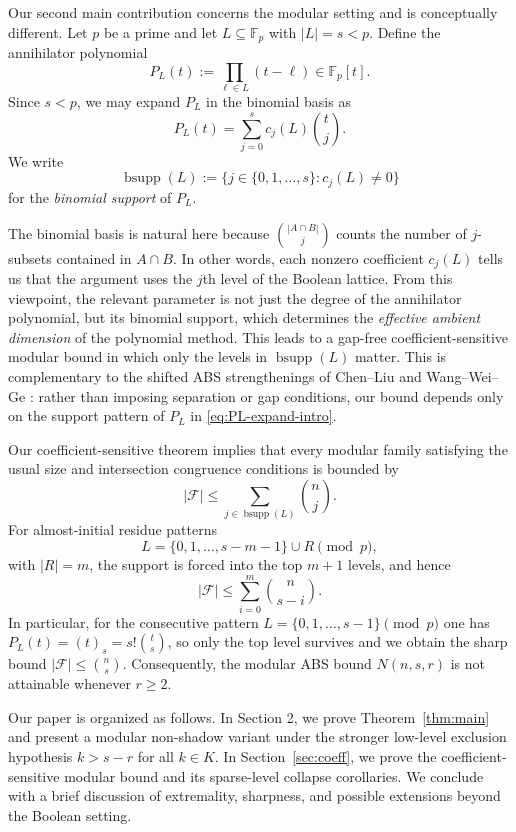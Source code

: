 \documentclass[11pt]{article}
\theoremstyle{plain}
\theoremstyle{remark}
\newcommand{\F}{\mathcal{F}}
\newcommand{\abs}[1]{\left|#1\right|}
\newcommand{\bsupp}{\operatorname{bsupp}}
\begin{document}
Our second main contribution concerns the modular setting and is conceptually different.
Let $p$ be a prime and let $L\subseteq\mathbb{F}_p$ with $\abs{L}=s<p$.
Define the annihilator polynomial
$$
  P_L(t):=\prod_{\ell\in L}(t-\ell)\in\mathbb{F}_p[t].
$$
Since $s<p$, we may expand $P_L$ in the binomial basis as
\begin{equation}\label{eq:PL-expand-intro}
  P_L(t)=\sum_{j=0}^{s} c_j(L)\binom{t}{j}.
\end{equation}
We write
$$
  \bsupp(L):=\{j\in\{0,1,\dots,s\}: c_j(L)\neq 0\}
$$
for the \emph{binomial support} of $P_L$.

The binomial basis is natural here because $\binom{|A\cap B|}{j}$ counts the number of $j$-subsets contained in $A\cap B$.
In other words, each nonzero coefficient $c_j(L)$ tells us that the argument uses the $j$th level of the
Boolean lattice.
From this viewpoint, the relevant parameter is not just the degree of the annihilator polynomial, but its
binomial support, which determines the \emph{effective ambient dimension} of the polynomial method.
This leads to a gap-free coefficient-sensitive modular bound in which only the levels in $\bsupp(L)$ matter.
This is complementary to the shifted ABS strengthenings of Chen--Liu and Wang--Wei--Ge
\cite{CL09,WWG18}: rather than imposing separation or gap conditions, our bound depends only on the support
pattern of $P_L$ in \eqref{eq:PL-expand-intro}.

Our coefficient-sensitive theorem implies that every modular family satisfying the usual size and
intersection congruence conditions is bounded by
$$
  \abs{\F}\le \sum_{j\in \bsupp(L)}\binom{n}{j}.
$$
For almost-initial residue patterns
$$
  L=\{0,1,\dots,s-m-1\}\cup R\pmod p,
$$
with $\abs{R}=m$, the support is forced into the top $m+1$ levels, and hence
$$
  \abs{\F}\le \sum_{i=0}^{m}\binom{n}{s-i}.
$$
In particular, for the consecutive pattern $L=\{0,1,\dots,s-1\}\pmod p$ one has
$P_L(t)=(t)_s=s!\binom{t}{s}$, so only the top level survives and we obtain the sharp bound
$\abs{\F}\le\binom{n}{s}$.
Consequently, the modular ABS bound $N(n,s,r)$ is not attainable whenever $r\ge 2$.

\medskip
Our paper is organized as follows.
In Section 2, we prove Theorem~\ref{thm:main} and present a modular non-shadow variant under the stronger low-level exclusion hypothesis $k>s-r$ for all $k\in K$.
In Section~\ref{sec:coeff}, we prove the coefficient-sensitive modular bound and its sparse-level collapse
corollaries.
We conclude with a brief discussion of extremality, sharpness, and possible extensions beyond the Boolean
setting.
\end{document}
